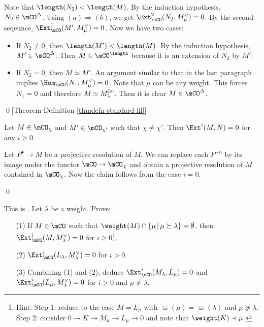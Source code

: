 		Note that $\length(N_2)<\length(M)$. By the induction hypothesis, $N_2\in \mCO^\Delta$. Using $(a)\Rightarrow(b)$, we get $\Ext_\mCO^2( N_2 , M_\mu^\vee )=0$. By the second seqeunce, $\Ext_\mCO^1( M' , M_\mu^\vee )=0$. Now we have two cases:
		\begin{itemize}
			\item 
				If $N_2\neq 0$, then $\length(M')<\length(M)$. By the induction hypothesis, $M'\in \mCO^\Delta$. Then $M\in \mCO^\length$ because it is an extension of $N_2$ by $M'$.
			\item
				If $N_2 = 0$, then $M\simeq M'$. An argument similar to that in the last paragraph implies $ \Hom_\mCO( N_1, M_\mu^\vee  ) = 0$. Note that $\mu$ can be any weight. This forces $N_1 =0$ and therefore $M\simeq M_\lambda^{\oplus n}$. Then it is clear $M\in \mCO^\Delta$.
		\end{itemize}


	\qed[Theorem-Definition \ref{thmdefn-standard-fil}]

	\begin{lem}
		Let $M\in \mCO_\chi$ and $M'\in \mCO_{\chi'}$ such that $\chi\neq \chi'$. Then $\Ext^i(M,N)=0$ for any $i\ge 0$.
	\end{lem}

	\proof
		Let $P^\bullet \to M$ be a projective resolution of $M$. We can replace each $P^{-n}$ by its image under the functor $\mCO \to \mCO_{\chi}$ and obtain a projective resolution of $M$ contained in $\mCO_\chi$. Now the claim follows from the case $i=0$.

	\qed

	\begin{exe}
		This is . Let $\lambda$ be a weight. Prove:
		\begin{itemize}
			\item[(1)]
				If $M\in \mCO$ such that $\weight(M)\cap \{\mu\,\vert\, \mu\succeq \lambda\}=\emptyset$, then $\Ext^i_\mCO(M,M_\lambda^\vee) =0$ for $i\ge 0$\footnote{Hint: Step 1: reduce to the case $M=L_\mu$ with $\varpi(\mu) = \varpi(\lambda)$ and $\mu\nsucceq \lambda$. Step 2: consider $0\to K \to M_\mu \to L_\mu \to 0$ and note that $\weight(K)\prec \mu$.}.
			\item[(2)]
				$\Ext^i_\mCO(L_\lambda,M_\lambda^\vee) =0$ for $i>0$.
			\item[(3)]
				Combining (1) and (2), deduce $\Ext^i_\mCO(M_\lambda,L_\mu) =0$ and $\Ext^i_\mCO(L_\mu,M_\lambda^\vee) =0$ for $i>0$ and $\mu\nsucc \lambda$.
		\end{itemize}

	\end{exe}
		
